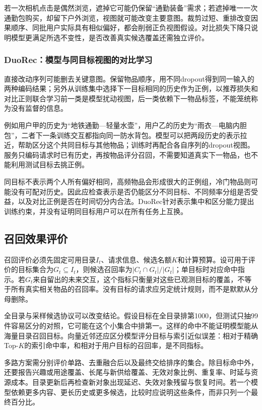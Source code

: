 若一次相机点击是偶然浏览，遮掉它可能仍保留“通勤装备”需求；若遮掉唯一一次通勤包购买，却留下户外浏览，视图就可能改变主要意图。裁剪过短、重排改变因果顺序、同批用户实际具有相似偏好，都会削弱正负视图假设。对比损失下降只说明模型更满足所选不变性，是否改善真实候选覆盖还需独立评价。

\subsubsection{DuoRec：模型与同目标视图的对比学习}
\label{sec:rs-duorec}

直接改动序列可能删去关键意图。保留物品顺序，用不同dropout得到同一输入的两种编码结果；另外从训练集中选择下一目标相同的历史作为正例，以推荐损失和对比正则联合学习前一类是模型扰动视图，后一类依赖下一物品标签，不能笼统称为没有监督的信息。

例如用户甲的历史为“地铁通勤—轻量水壶”，用户乙的历史为“雨衣—电脑内胆包”，二者下一条训练交互都指向同一防水背包。模型可以把两段历史的表示拉近，帮助区分这个共同目标与其他物品；训练时再配合各自序列的dropout视图。服务只编码请求时已有历史，再按物品评分召回，不需要知道真实下一物品，也不能利用测试目标去挑正例。

同目标不表示两个人所有偏好相同，高频物品会形成很大的正例组，冷门物品则可能没有可配对历史。因此应检查表示是否仍能区分不同目标、不同频率分组是否受益，以及对比正例是否在时间切分内合法。DuoRec针对表示集中和区分能力提出训练约束，并没有证明同目标用户可以在所有任务上互换。

\subsection{召回效果评价}
\label{sec:rs-retrieval-evaluation}

召回评价必须先固定可用目录$I_t$、请求信息、候选名额$K$和计算预算。设可用于评价的目标集合为$G_t\subseteq I_t$，则候选召回率为$|C_t\cap G_t|/|G_t|$；单目标时对应命中指示。若$G_t$来自留出的未来交互，这个指标只衡量对这些已观测目标的覆盖，不等于所有真实相关物品的召回率。没有目标的请求应另定统计规则，而不是默默从分母删除。

全目录与采样候选协议可以改变结论。假设目标在全目录排第1000，但测试只抽99件容易区分的对照，它可能在这个小集合中排第一。这样的命中不能证明模型能从海量目录召回目标。向量近邻还应区分模型评分目标与索引近似误差：相对于精确Top-$K$的索引命中率，和相对于用户目标的召回率，是不同指标。

多路方案需分别评价单路、去重融合后以及最终交给排序的集合。除目标命中外，还要报告兴趣或用途覆盖、长尾与新供给覆盖、无效对象比例、重复率、时延与资源成本。目录更新后再检查新对象出现延迟、失效对象残留与恢复时间。若一个模型依赖更多内容、更长历史或更多候选，比较时应说明这些条件，而非只列一个最终百分比。

